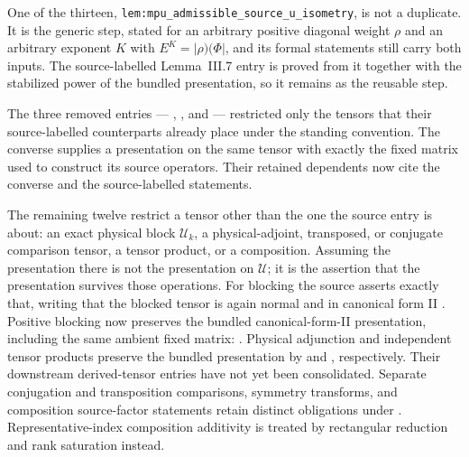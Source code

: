 \documentclass{article}
\begin{document}
One of the thirteen,
\texttt{lem:mpu\_admissible\_source\_u\_isometry}, is not a duplicate. It is
the generic step, stated for an arbitrary positive diagonal weight $\rho$ and
an arbitrary exponent $K$ with $E^{K}=\lvert\rho)(\Phi\rvert$, and its formal
statements still carry both inputs. The source-labelled Lemma~III.7 entry is
proved from it together with the stabilized power of the bundled presentation,
so it remains as the reusable step.

The three removed entries ---
,
, and
 --- restricted only the tensors that
their source-labelled counterparts already place under the standing
convention. The converse supplies a presentation on the same tensor with
exactly the fixed matrix used to construct its source operators. Their
retained dependents now cite the converse and the source-labelled statements.

The remaining twelve restrict a tensor other than the one the source entry is
about: an exact physical block $\mathcal U_k$, a physical-adjoint, transposed,
or conjugate comparison tensor, a tensor product, or a composition. Assuming
the presentation there is not the presentation on $\mathcal U$; it is the
assertion that the presentation survives those operations. For blocking the
source asserts exactly that, writing that the blocked tensor is again normal
and in canonical form II \cite[line~356]{Cirac2017MPU}. Positive blocking now
preserves the bundled canonical-form-II presentation, including the same
ambient fixed matrix:
. Physical adjunction
and independent tensor products preserve the bundled presentation by
 and
, respectively. Their
downstream derived-tensor entries have not yet been consolidated. Separate
conjugation and transposition comparisons, symmetry transforms, and
composition source-factor statements retain distinct obligations under
. Representative-index composition additivity is treated by
rectangular reduction and rank saturation instead.
\end{document}
